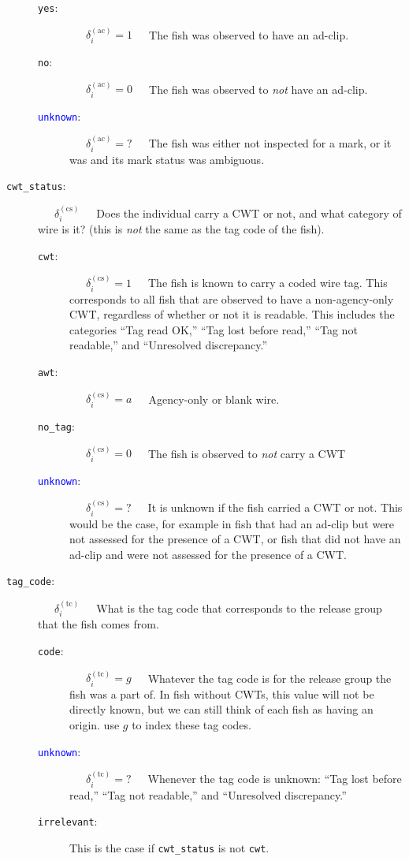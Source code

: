 \documentclass[11pt]{article}
\begin{document}
\begin{description}
\begin{description}
		\item [{\tt yes}:]  ~~~$\delta_i^{(\mathrm{ac})} = 1$~~~The fish was observed to have an ad-clip.
		\item [{\tt no}:]  ~~~$\delta_i^{(\mathrm{ac})} = 0$~~~The fish was observed to {\em not} have an ad-clip.
		\item [\textcolor{blue}{{\tt unknown}}:]  ~~~$\delta_i^{(\mathrm{ac})} = \mbox{?}$~~~The fish was either not
		inspected for a mark, or it was and its mark status was ambiguous.
	\end{description}
	\item [{\tt cwt\_status}:] ~~~$\delta_i^{(\mathrm{cs})}$~~~Does the individual carry a CWT or not, and what category of wire is
	it? (this is {\em not} the same as the tag code of the fish).
	\begin{description}
		\item [{\tt cwt}:] ~~~$\delta_i^{(\mathrm{cs})} = 1$~~~The fish is known to carry a coded wire tag. This corresponds to all fish that
		are observed to have a non-agency-only CWT, regardless of whether or not it is readable.  This 
		includes the categories ``Tag read OK,'' ``Tag lost before read,'' ``Tag not readable,'' 
		and ``Unresolved discrepancy.''
		\item [{\tt awt}:] ~~~$\delta_i^{(\mathrm{cs})} = a$~~~Agency-only or blank wire.
		\item [{\tt no\_tag}:] ~~~$\delta_i^{(\mathrm{cs})} = 0$~~~The fish is observed to {\em not} carry a CWT
		\item [\textcolor{blue}{{\tt unknown}}:] ~~~$\delta_i^{(\mathrm{cs})} = \mbox{?}$~~~It is unknown if the fish carried a CWT or not.  This would be the case, for example
		in fish that had an ad-clip but were not assessed for the presence of a CWT, or fish that did not have
		an ad-clip and were not assessed for the presence of a CWT.
	\end{description}
	\item [{\tt tag\_code}:] ~~~$\delta_i^{(\mathrm{tc})}$~~~What is the tag code that corresponds to the release group that the fish comes from.
	\begin{description}
		\item [{\tt code}:] ~~~$\delta_i^{(\mathrm{tc})} = g$~~~Whatever the tag code is for the release group the fish was a part of.  In fish without CWTs, this value will not be directly known, but we can still think of each
		fish as having an origin.
		use $g$ to index these tag codes.
		\item [\textcolor{blue}{{\tt unknown}}:] ~~~$\delta_i^{(\mathrm{tc})} = \mbox{?}$~~~Whenever the tag code is unknown: ``Tag lost before read,'' 
		``Tag not readable,'' and ``Unresolved discrepancy.''
		\item [{\tt irrelevant}:] This is the case if {\tt cwt\_status} is not {\tt cwt}.  
	\end{description}
\end{description}
\end{document}
